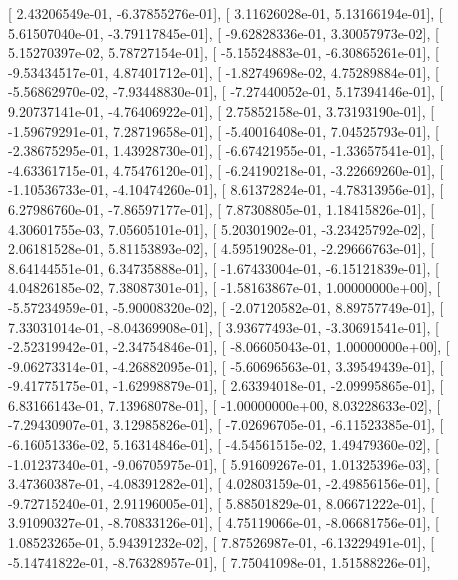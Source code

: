 \documentclass{article}
\begin{document}
       [  2.43206549e-01,  -6.37855276e-01],
       [  3.11626028e-01,   5.13166194e-01],
       [  5.61507040e-01,  -3.79117845e-01],
       [ -9.62828336e-01,   3.30057973e-02],
       [  5.15270397e-02,   5.78727154e-01],
       [ -5.15524883e-01,  -6.30865261e-01],
       [ -9.53434517e-01,   4.87401712e-01],
       [ -1.82749698e-02,   4.75289884e-01],
       [ -5.56862970e-02,  -7.93448830e-01],
       [ -7.27440052e-01,   5.17394146e-01],
       [  9.20737141e-01,  -4.76406922e-01],
       [  2.75852158e-01,   3.73193190e-01],
       [ -1.59679291e-01,   7.28719658e-01],
       [ -5.40016408e-01,   7.04525793e-01],
       [ -2.38675295e-01,   1.43928730e-01],
       [ -6.67421955e-01,  -1.33657541e-01],
       [ -4.63361715e-01,   4.75476120e-01],
       [ -6.24190218e-01,  -3.22669260e-01],
       [ -1.10536733e-01,  -4.10474260e-01],
       [  8.61372824e-01,  -4.78313956e-01],
       [  6.27986760e-01,  -7.86597177e-01],
       [  7.87308805e-01,   1.18415826e-01],
       [  4.30601755e-03,   7.05605101e-01],
       [  5.20301902e-01,  -3.23425792e-02],
       [  2.06181528e-01,   5.81153893e-02],
       [  4.59519028e-01,  -2.29666763e-01],
       [  8.64144551e-01,   6.34735888e-01],
       [ -1.67433004e-01,  -6.15121839e-01],
       [  4.04826185e-02,   7.38087301e-01],
       [ -1.58163867e-01,   1.00000000e+00],
       [ -5.57234959e-01,  -5.90008320e-02],
       [ -2.07120582e-01,   8.89757749e-01],
       [  7.33031014e-01,  -8.04369908e-01],
       [  3.93677493e-01,  -3.30691541e-01],
       [ -2.52319942e-01,  -2.34754846e-01],
       [ -8.06605043e-01,   1.00000000e+00],
       [ -9.06273314e-01,  -4.26882095e-01],
       [ -5.60696563e-01,   3.39549439e-01],
       [ -9.41775175e-01,  -1.62998879e-01],
       [  2.63394018e-01,  -2.09995865e-01],
       [  6.83166143e-01,   7.13968078e-01],
       [ -1.00000000e+00,   8.03228633e-02],
       [ -7.29430907e-01,   3.12985826e-01],
       [ -7.02696705e-01,  -6.11523385e-01],
       [ -6.16051336e-02,   5.16314846e-01],
       [ -4.54561515e-02,   1.49479360e-02],
       [ -1.01237340e-01,  -9.06705975e-01],
       [  5.91609267e-01,   1.01325396e-03],
       [  3.47360387e-01,  -4.08391282e-01],
       [  4.02803159e-01,  -2.49856156e-01],
       [ -9.72715240e-01,   2.91196005e-01],
       [  5.88501829e-01,   8.06671222e-01],
       [  3.91090327e-01,  -8.70833126e-01],
       [  4.75119066e-01,  -8.06681756e-01],
       [  1.08523265e-01,   5.94391232e-02],
       [  7.87526987e-01,  -6.13229491e-01],
       [ -5.14741822e-01,  -8.76328957e-01],
       [  7.75041098e-01,   1.51588226e-01],
\end{document}
